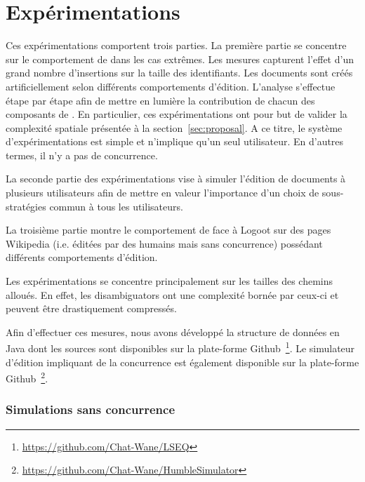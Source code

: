 
\section{Expérimentations}

Ces expérimentations comportent trois parties. La première partie se concentre
sur le comportement de \LSEQ dans les cas extrêmes. Les mesures capturent
l'effet d'un grand nombre d'insertions sur la taille des identifiants. Les
documents sont créés artificiellement selon différents comportements d'édition.
L'analyse s'effectue étape par étape afin de mettre en lumière la contribution
de chacun des composants de \LSEQ. En particulier, ces expérimentations ont pour
but de valider la complexité spatiale présentée à la section~\ref{sec:proposal}.
A ce titre, le système d'expérimentations est simple et n'implique qu'un seul
utilisateur. En d'autres termes, il n'y a pas de concurrence.


La seconde partie des expérimentations vise à simuler l'édition de documents à
plusieurs utilisateurs afin de mettre en valeur l'importance d'un choix de
sous-stratégies commun à tous les utilisateurs.

La troisième partie montre le comportement de \LSEQ face à Logoot sur des pages
Wikipedia (i.e. éditées par des humains mais sans concurrence) possédant
différents comportements d'édition.

Les expérimentations se concentre principalement sur les tailles des chemins
alloués. En effet, les disambiguators ont une complexité bornée par ceux-ci et
peuvent être drastiquement compressés.

Afin d'effectuer ces mesures, nous avons développé la structure de données \LSEQ
en Java dont les sources sont disponibles sur la plate-forme
Github~\footnote{\url{https://github.com/Chat-Wane/LSEQ}}. Le simulateur
d'édition impliquant de la concurrence est également disponible sur la
plate-forme
Github~\footnote{\url{https://github.com/Chat-Wane/HumbleSimulator}}.


\subsubsection{Simulations sans concurrence}

